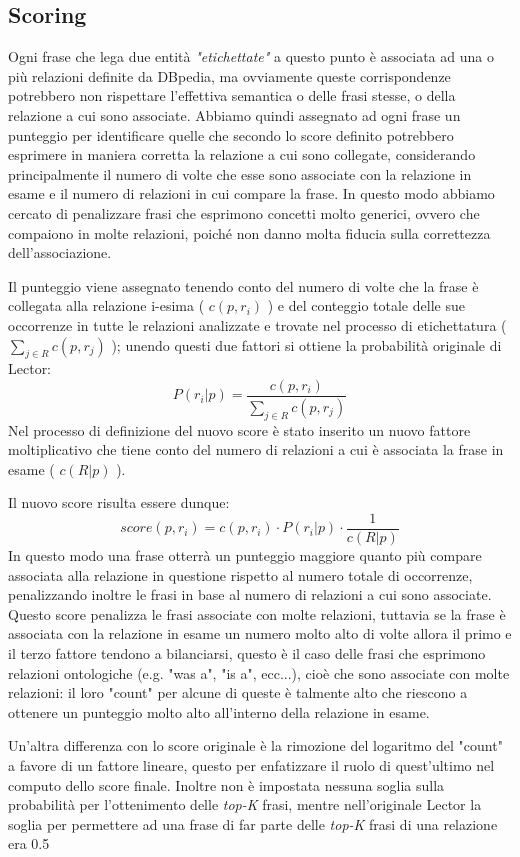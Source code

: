 \documentclass[10pt,a4paper,twocolumn]{article}
\begin{document}
\subsection{Scoring}

Ogni frase che lega due entità \textit{"etichettate"} a questo punto è associata ad una o più relazioni definite da DBpedia, ma ovviamente queste corrispondenze potrebbero non rispettare l'effettiva semantica o delle frasi stesse, o della relazione a cui sono associate. Abbiamo quindi assegnato ad ogni frase un punteggio per identificare quelle che secondo lo score definito potrebbero esprimere in maniera corretta la relazione a cui sono collegate, considerando principalmente il numero di volte che esse sono associate con la relazione in esame e il numero di relazioni in cui compare la frase. In questo modo abbiamo cercato di penalizzare frasi che esprimono concetti molto generici, ovvero che compaiono in molte relazioni, poiché non danno molta fiducia sulla correttezza dell'associazione.

Il punteggio viene assegnato tenendo conto del numero di volte che la frase è collegata alla relazione i-esima ( $c(p,r_i)$ ) e del conteggio totale delle sue occorrenze in tutte le relazioni analizzate e trovate nel processo di etichettatura ( $\sum_{j \in R} c(p,r_j)$ ); unendo questi due fattori si ottiene la probabilità originale di Lector:
\[P(r_i|p) = \frac{c(p,r_i)}{\sum_{j \in R}c(p,r_j)}\]
Nel processo di definizione del nuovo score è stato inserito un nuovo fattore moltiplicativo che tiene conto del numero di relazioni a cui è associata la frase in esame ( $c(R|p)$ ).

Il nuovo score risulta essere dunque:
\[score(p,r_i)=c(p,r_i)\cdot P(r_i|p)\cdot \frac{1}{c(R|p)} \]
In questo modo una frase otterrà un punteggio maggiore quanto più compare associata alla relazione in questione rispetto al numero totale di occorrenze, penalizzando inoltre le frasi in base al numero di relazioni a cui sono associate. Questo score penalizza le frasi associate con molte relazioni, tuttavia se la frase è associata con la relazione in esame un numero molto alto di volte allora il primo e il terzo fattore tendono a bilanciarsi, questo è il caso delle frasi che esprimono relazioni ontologiche (e.g. "was a", "is a", ecc...), cioè che sono associate con molte relazioni: il loro "count" per alcune di queste è talmente alto che riescono a ottenere un punteggio molto alto all'interno della relazione in esame.

Un'altra differenza con lo score originale è la rimozione del logaritmo del "count" a favore di un fattore lineare, questo per enfatizzare il ruolo di quest'ultimo nel computo dello score finale. Inoltre non è impostata nessuna soglia sulla probabilità per l'ottenimento delle \textit{top-K} frasi, mentre nell'originale Lector la soglia per permettere ad una frase di far parte delle \textit{top-K} frasi di una relazione era 0.5
\end{document}
